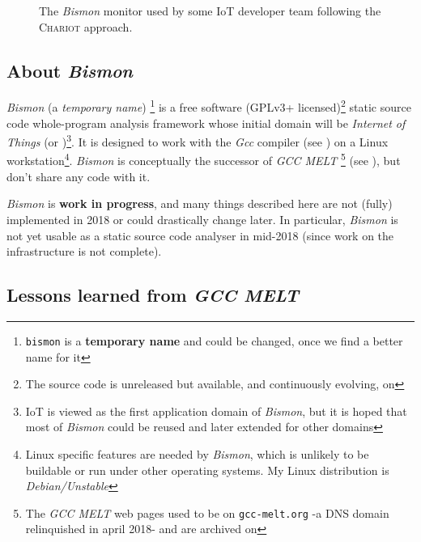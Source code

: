 \begin{figure}
  \begin{center}
  \end{center}
  \caption{The \emph{Bismon} monitor used by some IoT developer team following the \textsc{Chariot} approach.}
  \label{fig:bismonit}
\end{figure}

\newpage 
\subsection{About \textit{Bismon}}

\textit{Bismon} (a \emph{temporary name}) \footnote{\texttt{bismon} is
  a \textbf{temporary name} and could be changed, once we find a
  better name for it} is a free software (GPLv3+
licensed)\footnote{The source code is unreleased but available, and
  continuously evolving, on
  } static source code
whole-program analysis framework whose initial domain will be
\emph{Internet of Things} (or )\footnote{IoT is viewed
  as the first application domain of \textit{Bismon}, but it is hoped
  that most of \textit{Bismon} could be reused and later extended for
  other domains}. It is designed to work with the \textit{Gcc}
compiler (see ) on a Linux
workstation\footnote{Linux specific features are needed by
  \textit{Bismon}, which is unlikely to be buildable or run under
  other operating systems. My Linux distribution is
  \emph{Debian/Unstable}}. \textit{Bismon} is conceptually the
successor of \textit{GCC MELT} \footnote{The \textit{GCC MELT} web
  pages used to be on \texttt{gcc-melt.org} -a DNS domain relinquished
  in april 2018- and are archived on
  } (see
\cite{Starynkevitch2007Multistage, starynkevitch-DSL2011}), but don't
share any code with it.

{\large \textit{Bismon} is \textbf{work in progress}}, and many things
described here are not (fully) implemented in 2018 or
could drastically change later. In particular, \textit{Bismon} is not
yet usable as a static source code analyser in mid-2018 (since work on
the infrastructure is not complete).

\bigskip

\subsection{Lessons learned from \textit{GCC MELT}}

